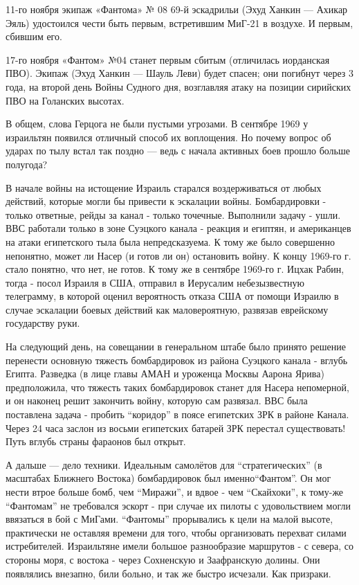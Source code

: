 11-го ноября экипаж «Фантома» № 08 69-й эскадрильи (Эхуд Ханкин — Ахикар Эяль) удостоился чести быть первым, встретившим МиГ-21 в воздухе. И первым, сбившим его.

17-го ноября «Фантом» №04 станет первым сбитым (отличилась иорданская ПВО). Экипаж (Эхуд Ханкин — Шауль Леви) будет спасен; они погибнут через 3 года, на второй день Войны Судного дня, возглавляя атаку на позиции сирийских ПВО на Голанских высотах.

В общем, слова Герцога не были пустыми угрозами. В сентябре 1969 у израильтян появился отличный способ их воплощения. Но почему вопрос об ударах по тылу встал так поздно — ведь с начала активных боев прошло больше полугода?

В начале войны на истощение Израиль старался воздерживаться от любых действий, которые могли бы привести к эскалации войны. Бомбардировки - только ответные, рейды за канал - только точечные. Выполнили задачу - ушли. ВВС работали только в зоне Суэцкого канала - реакция и египтян, и американцев на атаки египетского тыла была непредсказуема. К тому же было совершенно непонятно, может ли Насер (и готов ли он) остановить войну. К концу 1969-го г. стало понятно, что нет, не готов. К тому же в сентябре 1969-го г. Ицхак Рабин, тогда - посол Израиля в США, отправил в Иерусалим небезызвестную телеграмму, в которой оценил вероятность отказа США от помощи Израилю в случае эскалации боевых действий как маловероятную, развязав еврейскому государству руки.

На следующий день, на совещании в генеральном штабе было принято решение перенести основную тяжесть бомбардировок из района Суэцкого канала - вглубь Египта. Разведка (в лице главы АМАН и уроженца Москвы Аарона Ярива) предположила, что тяжесть таких бомбардировок станет для Насера непомерной, и он наконец решит закончить войну, которую сам развязал. ВВС была поставлена задача - пробить “коридор” в поясе египетских ЗРК в районе Канала. Через 24 часа заслон из восьми египетских батарей ЗРК перестал существовать! Путь вглубь страны фараонов был открыт.

А дальше — дело техники. Идеальным самолётов для “стратегических” (в масштабах Ближнего Востока) бомбардировок был именно“Фантом”. Он мог нести втрое больше бомб, чем “Миражи”, и вдвое - чем “Скайхоки”, к тому-же “Фантомам” не требовался эскорт - при случае их пилоты с удовольствием могли ввязаться в бой с МиГами. “Фантомы” прорывались к цели на малой высоте, практически не оставляя времени для того, чтобы организовать перехват силами истребителей. Израильтяне имели большое разнообразие маршрутов - с севера, со стороны моря, с востока - через Сохненскую и Заафранскую долины. Они появлялись внезапно, били больно, и так же быстро исчезали. Как призраки.

